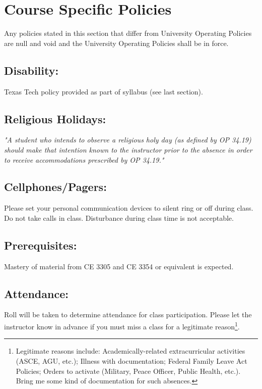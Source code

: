 \documentclass[12pt]{article}
\begin{document}
\section*{Course Specific Policies}
Any  policies stated in this section that differ from University Operating Policies are null and void and the University Operating Policies shall be in force.
\subsection*{Disability:}
Texas Tech policy provided as part of syllabus (see last section).


\subsection*{Religious Holidays:}
\textsl{ "A student who intends to observe a religious holy day (as defined by OP 34.19) should
make that intention known to the instructor prior to the absence in order to receive accommodations
prescribed by OP 34.19."}

\subsection*{Cellphones/Pagers:}
Please set your personal communication devices to silent ring or off during class. 
Do not take calls in class. Disturbance during class time is not acceptable.

\subsection*{Prerequisites:} 
Mastery of material from CE 3305 and CE 3354 or equivalent is expected.

\subsection*{Attendance:} Roll will be taken to determine attendance for class participation.  Please let the instructor know in advance if you must miss a class for a legitimate reason\footnote{Legitimate reasons include: Academically-related extracurricular activities (ASCE, AGU, etc.); Illness with documentation; Federal Family Leave Act Policies; Orders to activate (Military, Peace Officer, Public Health, etc.).  Bring me some kind of documentation for such absences.}. 
\end{document}
